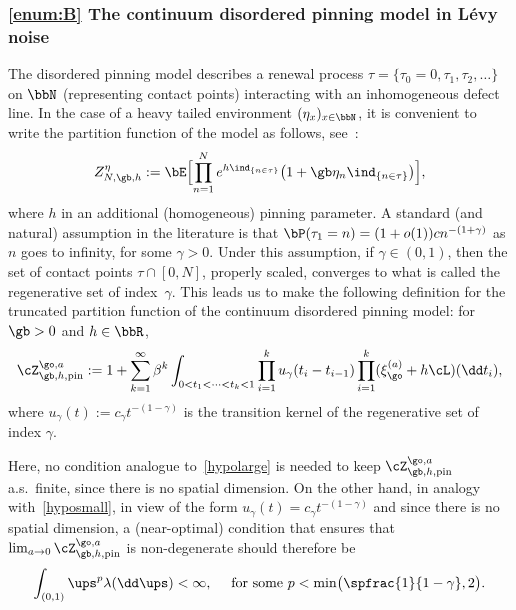 \subsubsection*{\eqref{enum:B} The continuum disordered pinning model in Lévy noise}
The disordered pinning model describes a renewal process $\tau = \{\tau_0=0,\tau_1,\tau_2,\ldots\}$ on $\bbN$ (representing contact points) interacting with an inhomogeneous defect line.
In the case of a heavy tailed environment
$(\eta_x)_{x\in \bbN}$,
it is convenient to write the partition function of the model as follows,
see~\cite{LS17}:
\begin{equation}
\label{def:pinning}
Z_{N,\gb,h}^{\eta} := \bE\Bigl[ \prod_{n=1}^N e^{h \ind_{\{n\in\tau \}}} \bigl(1+ \gb \eta_{n} \ind_{\{n\in \tau\}} \bigr) \Bigr],
\end{equation}
where $h$ in an additional (homogeneous) pinning parameter.
A standard (and natural) assumption in the literature is that
$\bP(\tau_1= n) = (1+o(1)) c n^{-(1+\gamma)}$ as $n$ goes to infinity, for some $\gamma>0$. Under this assumption, if $\gamma\in (0,1)$, then the set of contact
points $\tau \cap [0,N]$, properly scaled,
converges to what is called the regenerative set of index~$\gamma$.
This leads us to make the following definition
for the truncated partition function of the continuum
disordered pinning model: for $\gb>0$ and $h\in \bbR$,\vspace*{-3pt}\enlargethispage{.5\baselineskip}%
\begin{equation}
\label{pinning}
\cZ_{\gb,h,\mathrm{pin}}^{\go,a} := 1+\sum_{k=1}^\infty \beta^k\int_{0<t_1<\dots<t_k<1} \prod_{i=1}^k u_{\gamma} (t_i-t_{i-1}) \prod_{i=1}^k (\xi_{\go}^{(a)} + h\cL) (\dd t_i),
\end{equation}
where $u_{\gamma}(t) := c_{\gamma} t^{-(1-\gamma)}$
is the transition kernel of the regenerative set of index $\gamma$.

Here, no condition analogue to~\eqref{hypolarge} is needed to keep $\cZ_{\gb,h,\mathrm{pin}}^{\go,a} $ a.s.\ finite, since there is no spatial dimension.
On the other hand, in analogy with~\eqref{hyposmall}, in view of the form $u_{\gamma}(t) = c_{\gamma} t^{-(1-\gamma)}$ and since there is no spatial dimension,
a (near-optimal) condition that ensures that
$\lim_{a\to 0}\cZ_{\gb,h, \mathrm{pin}}^{\go,a}$ is non-degenerate should therefore be\vspace*{-3pt}
\begin{equation}
\label{hyposmallpinning}
\int_{(0,1)} \ups^{p} \lambda(\dd \ups) <\infty,\quad \text{ for some } p< \min\bigl(\spfrac{1}{1-\gamma}, 2 \bigr).
\end{equation}

